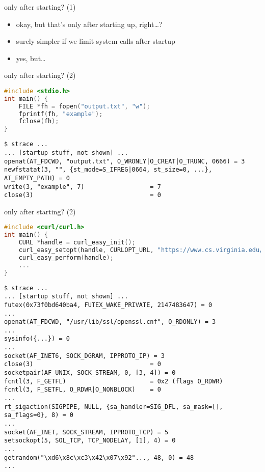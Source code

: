 \begin{frame}[fragile]{only after starting? (1)}
\begin{itemize}
\item okay, but that's only after starting up, right\ldots?
\item surely simpler if we limit system calls after startup
\item yes, but\ldots
\end{itemize}
\end{frame}

\begin{frame}[fragile]{only after starting? (2)}
\begin{lstlisting}[language=C,style=smaller]
#include <stdio.h>
int main() {
    FILE *fh = fopen("output.txt", "w");
    fprintf(fh, "example");
    fclose(fh);
}
\end{lstlisting}
\hrulefill
\begin{Verbatim}[fontsize=\fontsize{9}{10}]
$ strace ...
... [startup stuff, not shown] ...
openat(AT_FDCWD, "output.txt", O_WRONLY|O_CREAT|O_TRUNC, 0666) = 3
newfstatat(3, "", {st_mode=S_IFREG|0664, st_size=0, ...}, AT_EMPTY_PATH) = 0
write(3, "example", 7)                  = 7
close(3)                                = 0
\end{Verbatim}
\end{frame}

\begin{frame}[fragile]{only after starting? (2)}
\begin{lstlisting}[language=C,style=script]
#include <curl/curl.h>
int main() {
    CURL *handle = curl_easy_init();
    curl_easy_setopt(handle, CURLOPT_URL, "https://www.cs.virginia.edu/~cr4bd/test.txt");
    curl_easy_perform(handle);
    ...
}
\end{lstlisting}
\vspace{-.5cm}
\hrulefill
\begin{Verbatim}[fontsize=\fontsize{8}{9}]
$ strace ...
... [startup stuff, not shown] ...
futex(0x73f0bd640ba4, FUTEX_WAKE_PRIVATE, 2147483647) = 0                                               
...
openat(AT_FDCWD, "/usr/lib/ssl/openssl.cnf", O_RDONLY) = 3
...
sysinfo({...}) = 0
...
socket(AF_INET6, SOCK_DGRAM, IPPROTO_IP) = 3
close(3)                                = 0                                                             
socketpair(AF_UNIX, SOCK_STREAM, 0, [3, 4]) = 0                                                         
fcntl(3, F_GETFL)                       = 0x2 (flags O_RDWR)                                            
fcntl(3, F_SETFL, O_RDWR|O_NONBLOCK)    = 0                                                             
...
rt_sigaction(SIGPIPE, NULL, {sa_handler=SIG_DFL, sa_mask=[], sa_flags=0}, 8) = 0                        
...
socket(AF_INET, SOCK_STREAM, IPPROTO_TCP) = 5
setsockopt(5, SOL_TCP, TCP_NODELAY, [1], 4) = 0
...
getrandom("\xd6\x8c\xc3\x42\x07\x92"..., 48, 0) = 48 
...
\end{Verbatim}
\end{frame}

